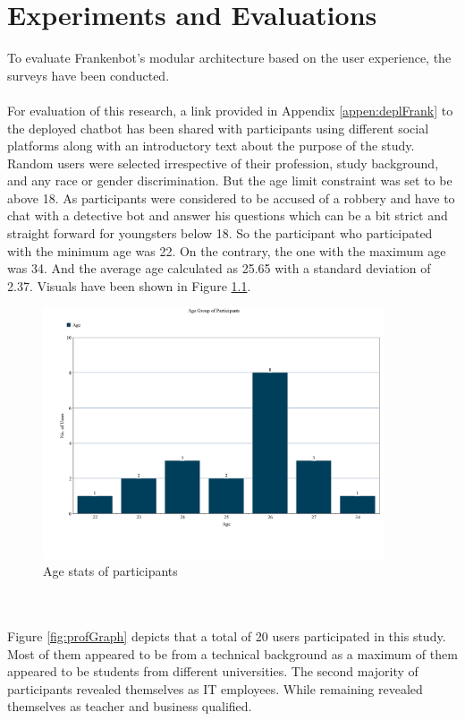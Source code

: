 \chapter{Experiments and Evaluations\label{cha:chapter4}}

To evaluate Frankenbot's modular architecture based on the user experience, the surveys have been conducted. 
\\~\\
For evaluation of this research, a link provided in Appendix \ref{appen:deplFrank} to the deployed chatbot has been shared with participants using different social platforms along with an introductory text about the purpose of the study. Random users were selected irrespective of their profession, study background, and any race or gender discrimination. But the age limit constraint was set to be above 18. As participants were considered to be accused of a robbery and have to chat with a detective bot and answer his questions which can be a bit strict and straight forward for youngsters below 18. So the participant who participated with the minimum age was 22. On the contrary, the one with the maximum age was 34. And the average age calculated as 25.65 with a standard deviation of 2.37. Visuals have been shown in Figure \ref{fig:ageGraph}.

\begin{figure}[!h]
    \centering
    \includegraphics[width=0.9\textwidth]{img/Age_Graph_Updated.PNG}
    \caption{Age stats of participants}
    \label{fig:ageGraph}
\end{figure}
\\~\\
Figure \ref{fig:profGraph} depicts that a total of 20 users participated in this study. Most of them appeared to be from a technical background as a maximum of them appeared to be students from different universities. The second majority of participants revealed themselves as IT employees. While remaining revealed themselves as teacher and business qualified.

